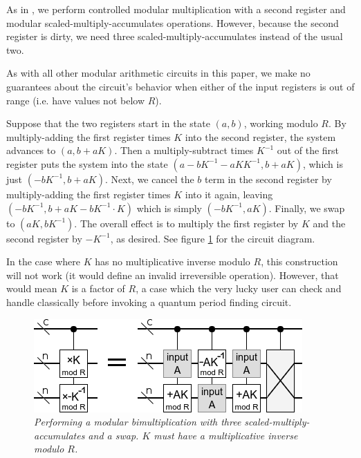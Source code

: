 \documentclass[twocolumn]{article}
\begin{document}
As in \cite{beauregard2003}, we perform controlled modular multiplication with a second register and modular scaled-multiply-accumulates operations.
However, because the second register is dirty, we need three scaled-multiply-accumulates instead of the usual two.

As with all other modular arithmetic circuits in this paper, we make no guarantees about the circuit's behavior when either of the input registers is out of range (i.e. have values not below $R$).

Suppose that the two registers start in the state $(a, b)$, working modulo $R$.
By multiply-adding the first register times $K$ into the second register, the system advances to $(a, b+aK)$.
Then a multiply-subtract times $K^{-1}$ out of the first register puts the system into the state $(a-bK^{-1}-aKK^{-1}, b+aK)$, which is just $(-bK^{-1}, b+aK)$.
Next, we cancel the $b$ term in the second register by multiply-adding the first register times $K$ into it again, leaving $(-bK^{-1}, b+aK-bK^{-1} \cdot K)$ which is simply $(-bK^{-1}, aK)$.
Finally, we swap to $(aK, bK^{-1})$.
The overall effect is to multiply the first register by $K$ and the second register by $-K^{-1}$, as desired.
See figure \ref{fig:controlled-modular-multiply} for the circuit diagram.

In the case where $K$ has no multiplicative inverse modulo $R$, this construction will not work (it would define an invalid irreversible operation).
However, that would mean $K$ is a factor of $R$, a case which the very lucky user can check and handle classically before invoking a quantum period finding circuit.

\begin{figure}
  \centering
  \includegraphics[width=\linewidth]{assets/controlled-modular-multiply.png}
  \caption{\em
    Performing a modular bimultiplication with three scaled-multiply-accumulates and a swap.
    $K$ must have a multiplicative inverse modulo $R$.
  }
  \label{fig:controlled-modular-multiply}
\end{figure}
\end{document}
